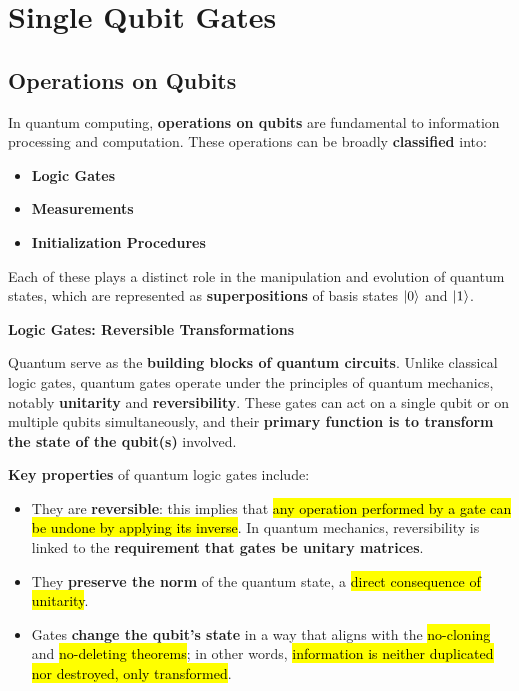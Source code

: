 \section{Single Qubit Gates}

\subsection{Operations on Qubits}

In quantum computing, \textbf{operations on qubits} are fundamental to information processing and computation. These operations can be broadly \textbf{classified} into:
\begin{itemize}
    \item \textbf{Logic Gates}
    \item \textbf{Measurements}
    \item \textbf{Initialization Procedures}
\end{itemize}
Each of these plays a distinct role in the manipulation and evolution of quantum states, which are represented as \textbf{superpositions} of basis states $| 0 \rangle$ and $| 1 \rangle$.

\highspace
\begin{flushleft}
    \textcolor{Green3}{ \textbf{Logic Gates: Reversible Transformations}}
\end{flushleft}
Quantum  serve as the \textbf{building blocks of quantum circuits}. Unlike classical logic gates, quantum gates operate under the principles of quantum mechanics, notably \textbf{unitarity} and \textbf{reversibility}. These gates can act on a single qubit or on multiple qubits simultaneously, and their \textbf{primary function is to transform the state of the qubit(s)} involved.

\highspace
\textbf{Key properties} of quantum logic gates include:
\begin{itemize}
    \item They are \textbf{reversible}: this implies that \hl{any operation performed by a gate can be undone by applying its inverse}. In quantum mechanics, reversibility is linked to the \textbf{requirement that gates be unitary matrices}.

    \item They \textbf{preserve the norm} of the quantum state, a \hl{direct consequence of unitarity}.
    \item Gates \textbf{change the qubit's state} in a way that aligns with the \hl{no-cloning} and \hl{no-deleting theorems}; in other words, \hl{information is neither duplicated nor destroyed, only transformed}.
\end{itemize}

